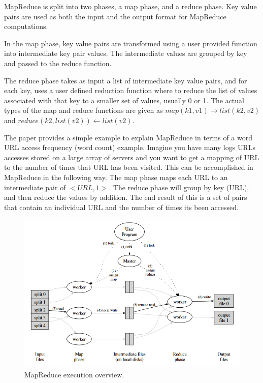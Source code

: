 \documentclass[]{article}
\begin{document}
MapReduce is split into two phases, a map phase, and a reduce phase. Key value pairs are used as both the input and the output format for MapReduce computations. 

In the map phase, key value pairs are transformed using a user provided function into intermediate key pair values. The intermediate values are grouped by key and passed to the reduce function.

The reduce phase takes as input a list of intermediate key value pairs, and for each key, uses a user defined reduction function where to reduce the list of values associated with that key to a smaller set of values, usually 0 or 1. The actual types of the map and reduce functions are given as $map(k1, v1)\longrightarrow list(k2,v2)$ and $reduce(k2, list(v2))\longleftarrow list(v2)$.

The paper provides a simple example to explain MapReduce in terms of a word URL access frequency (word count) example. Imagine you have many logs URLs accesses stored on a large array of servers and you want to get a mapping of URL to the number of times that URL has been visited. This can be accomplished in MapReduce in the following way. The map phase maps each URL to an intermediate pair of $<URL, 1>$. The reduce phase will group by key (URL), and then reduce the values by addition. The end result of this is a set of pairs that contain an individual URL and the number of times its been accessed.

\begin{figure}
    \centering
    \includegraphics[width=1.0\linewidth]{img/mr-execution}
    \caption[MapReduce execution overview.]{MapReduce execution overview. \cite{dean2008mapreduce}}
    \label{fig:mr-execution}
\end{figure}
\end{document}
